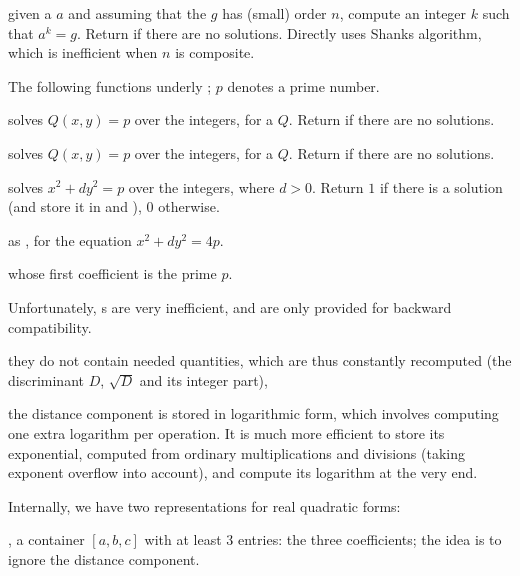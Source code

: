  given a  $a$ and
assuming that the  $g$ has (small) order $n$, compute an integer $k$
such that $a^k = g$. Return  if there are no solutions.
Directly uses Shanks algorithm, which is inefficient when $n$ is composite.


The following functions underly ; $p$ denotes a prime number.

 solves $Q(x,y) = p$ over the integers, for
a  $Q$. Return  if there are no solutions.

 solves $Q(x,y) = p$ over the integers, for
a  $Q$. Return  if there are no solutions.

 solves
$x^2+ dy^2 = p$ over the integers, where $d > 0$. Return $1$ if there is a
solution (and store it in  and ), $0$ otherwise.

 as ,
for the equation $x^2 + dy^2 = 4p$.


  whose first coefficient
is the prime $p$.


 Unfortunately, s
are very inefficient, and are only provided for backward compatibility.

\item they do not contain needed quantities, which are thus constantly
recomputed (the discriminant $D$, $\sqrt{D}$ and its integer part),

\item the distance component is stored in logarithmic form, which involves
computing one extra logarithm per operation. It is much more efficient
to store its exponential, computed from ordinary multiplications and
divisions (taking exponent overflow into account), and compute its logarithm
at the very end.

Internally, we have two representations for real quadratic forms:

\item {}, a container $[a,b,c]$ with at least 3 entries: the three
coefficients; the idea is to ignore the distance component.

